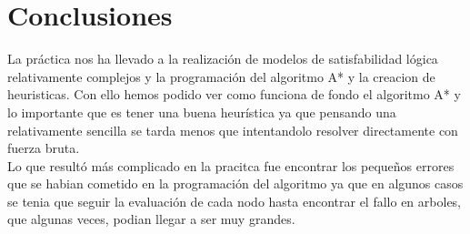 \documentclass[11pt,spanish]{article}
\begin{document}
	\section{Conclusiones}
		La práctica nos ha llevado a la realización de modelos de satisfabilidad lógica relativamente complejos y la programación del algoritmo A* y la creacion de heuristicas. Con ello hemos podido ver como funciona de fondo el algoritmo A* y lo importante que es tener una buena heurística ya que pensando una relativamente sencilla se tarda menos que intentandolo resolver directamente con fuerza bruta.\\
		Lo que resultó más complicado en la pracitca fue encontrar los pequeños errores que se habian cometido en la programación del algoritmo ya que en algunos casos se tenia que seguir la evaluación de cada nodo hasta encontrar el fallo en arboles, que algunas veces, podian llegar a ser muy grandes.

\end{document}

